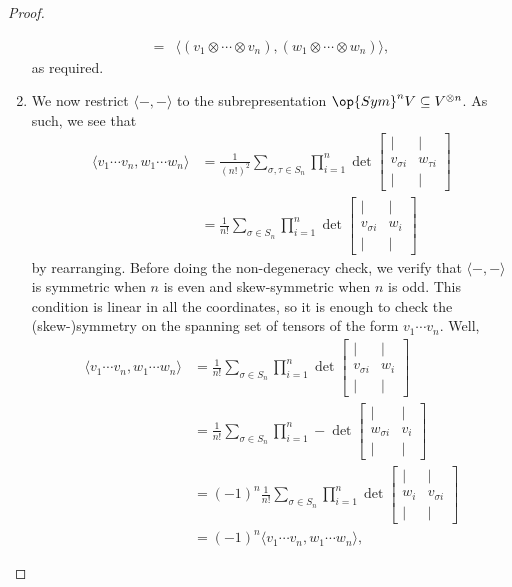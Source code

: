 \documentclass[../notes.tex]{subfiles}
\begin{document}
\begin{proof}
\begin{enumerate}
\begin{align*}
			={}& \big\langle (v_1\otimes\cdots\otimes v_n),(w_1\otimes\cdots\otimes w_n)\big\rangle,
		\end{align*}
		as required.
		\item We now restrict $\langle-,-\rangle$ to the subrepresentation $\op{Sym}^nV\subseteq V^{\otimes n}$. As such, we see that
		\begin{align*}
			\langle v_1\cdots v_n,w_1\cdots w_n\rangle &= \frac1{(n!)^2}\sum_{\sigma,\tau\in S_n}\prod_{i=1}^n\det\begin{bmatrix}
				| & | \\
				v_{\sigma i} & w_{\tau i} \\
				| & |
			\end{bmatrix} \\
			&= \frac1{n!}\sum_{\sigma\in S_n}\prod_{i=1}^n\det\begin{bmatrix}
				| & | \\
				v_{\sigma i} & w_{i} \\
				| & |
			\end{bmatrix}
		\end{align*}
		by rearranging. Before doing the non-degeneracy check, we verify that $\langle-,-\rangle$ is symmetric when $n$ is even and skew-symmetric when $n$ is odd. This condition is linear in all the coordinates, so it is enough to check the (skew-)symmetry on the spanning set of tensors of the form $v_1\cdots v_n$. Well,
		\begin{align*}
			\langle v_1\cdots v_n,w_1\cdots w_n\rangle &= \frac1{n!}\sum_{\sigma\in S_n}\prod_{i=1}^n\det\begin{bmatrix}
				| & | \\
				v_{\sigma i} & w_{i} \\
				| & |
			\end{bmatrix} \\
			&= \frac1{n!}\sum_{\sigma\in S_n}\prod_{i=1}^n-\det\begin{bmatrix}
				| & | \\
				w_{\sigma i} & v_{i} \\
				| & |
			\end{bmatrix} \\
			&= (-1)^n\frac1{n!}\sum_{\sigma\in S_n}\prod_{i=1}^n\det\begin{bmatrix}
				| & | \\
				w_{i} & v_{\sigma i} \\
				| & |
			\end{bmatrix} \\
			&= (-1)^n\langle v_1\cdots v_n,w_1\cdots w_n\rangle,

\end{align*}
\end{enumerate}
\end{proof}
\end{document}
